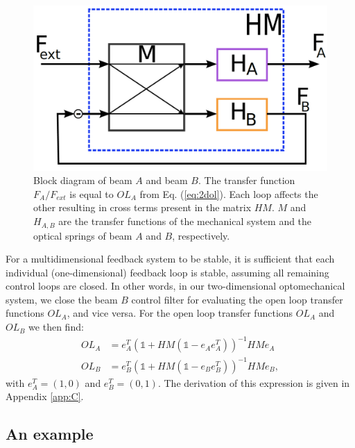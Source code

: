 \begin{figure}[htbp]
\begin{center}
		\includegraphics[width=.7\textwidth]{figures/theory/block_mimo_paper2c.png}
	\caption[Block diagram of beam $A$ and beam $B$]{Block diagram of beam $A$ and beam $B$. The transfer function $F_A/F_{ext}$ is equal to $OL_A$ from Eq. (\ref{eq:2dol}). Each loop affects the other resulting in cross terms
	present in the matrix $HM$. $M$ and $H_{A,B}$ are the transfer functions of the mechanical system and the optical springs of beam $A$ and $B$, respectively.}
	\label{fig:block_loops}
	\end{center}
\end{figure}


For a multidimensional feedback system to be stable, it is sufficient that each individual (one-dimensional) feedback loop is stable, assuming all remaining control loops are closed. In other words, in our two-dimensional optomechanical system, we close the beam $B$ control filter for evaluating the open loop transfer functions $OL_{A}$, and vice versa. For the open loop transfer functions $OL_{A}$ and $OL_{B}$ we then find: 
\begin{align}
\label{eq:2dol}
OL_{A}&=e_A^{T}\left(\mathds{1}+HM (\mathds{1} - e_A e_A^T) \right)^{-1}HMe_A \nonumber \\
OL_{B}&=e_B^{T}\left(\mathds{1}+HM (\mathds{1} - e_B e_B^T) \right)^{-1}HMe_B, 
\end{align}
with $e_A^T=(1,0)$ and $e_B^T=(0,1)$. The derivation of this expression is given in Appendix \ref{app:C}.




\subsection{An example}

